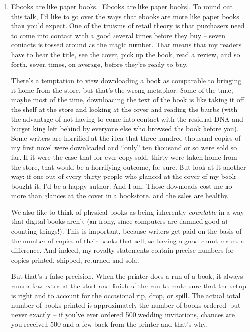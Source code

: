 \begin{enumerate}
\item
  Ebooks are like paper books. [Ebooks are like paper books]. To
  round out this talk, I'd like to go over the ways that ebooks are
  more like paper books than you'd expect. One of the truisms of
  retail theory is that purchasers need to come into contact with a
  good several times before they buy -- seven contacts is tossed
  around as the magic number. That means that my readers have to hear
  the title, see the cover, pick up the book, read a review, and so
  forth, seven times, on average, before they're ready to buy.

  There's a temptation to view downloading a book as comparable to
  bringing it home from the store, but that's the wrong metaphor.
  Some of the time, maybe most of the time, downloading the text of
  the book is like taking it off the shelf at the store and looking
  at the cover and reading the blurbs (with the advantage of not
  having to come into contact with the residual DNA and burger king
  left behind by everyone else who browsed the book before you). Some
  writers are horrified at the idea that three hundred thousand
  copies of my first novel were downloaded and ``only'' ten thousand or
  so were sold so far. If it were the case that for ever copy sold,
  thirty were taken home from the store, that would be a horrifying
  outcome, for sure. But look at it another way: if one out of every
  thirty people who glanced at the cover of my book bought it, I'd be
  a happy author. And I am. Those downloads cost me no more than
  glances at the cover in a bookstore, and the sales are healthy.
  
  We also like to think of physical books as being inherently
  \emph{countable} in a way that digital books aren't (an irony,
  since computers are damned good at counting things!). This is
  important, because writers get paid on the basis of the number of
  copies of their books that sell, so having a good count makes a
  difference. And indeed, my royalty statements contain precise
  numbers for copies printed, shipped, returned and sold.
  
  But that's a false precision. When the printer does a run of a
  book, it always runs a few extra at the start and finish of the run
  to make sure that the setup is right and to account for the
  occasional rip, drop, or spill. The actual total number of books
  printed is approximately the number of books ordered, but never
  exactly -- if you've ever ordered 500 wedding invitations, chances
  are you received 500-and-a-few back from the printer and that's
  why.
  

\end{enumerate}
